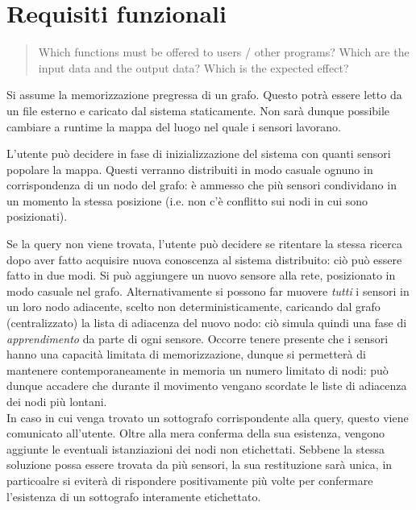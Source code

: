\documentclass{llncs}
\begin{document}
\section{Requisiti funzionali}
\label{sec:func-req}
\begin{quote}
  Which functions must be offered to users / other programs?
  Which are the input data and the output data?
  Which is the expected effect?
\end{quote}

Si assume la memorizzazione pregressa di un grafo.
Questo potrà essere letto da un file esterno e caricato dal sistema
staticamente. Non sarà dunque possibile cambiare a runtime la mappa
del luogo nel quale i sensori lavorano.

L'utente può decidere in fase di inizializzazione del sistema con quanti
sensori popolare la mappa. Questi verranno distribuiti in modo casuale
ognuno in corrispondenza di un nodo del grafo: è ammesso che più
sensori condividano in un momento la stessa posizione
(i.e. non c'è conflitto sui nodi in cui sono posizionati).


Se la query non viene trovata, l'utente può decidere se ritentare
la stessa ricerca dopo aver fatto acquisire nuova conoscenza al sistema
distribuito: ciò può essere fatto in due modi.
Si può aggiungere un nuovo sensore alla rete, posizionato in modo
casuale nel grafo. Alternativamente
si possono far muovere \emph{tutti} i sensori in un loro nodo adiacente,
scelto non deterministicamente, caricando dal grafo (centralizzato)
la lista di adiacenza del nuovo nodo: ciò simula quindi una fase di
\emph{apprendimento} da parte di ogni sensore. Occorre tenere presente
che i sensori hanno una capacità limitata di memorizzazione,
dunque si permetterà di mantenere contemporaneamente in memoria un
numero limitato di nodi: può dunque accadere che durante il movimento
vengano scordate le liste di adiacenza dei nodi più lontani.
\\

In caso in cui venga trovato un sottografo corrispondente alla query,
questo viene comunicato all'utente.
Oltre alla mera conferma della sua esistenza, vengono aggiunte
le eventuali istanziazioni dei nodi non etichettati.
Sebbene la stessa soluzione possa essere trovata da più sensori,
la sua restituzione sarà unica, in particoalre si eviterà di rispondere
positivamente più volte per confermare l'esistenza di un sottografo
interamente etichettato.\\
\end{document}
